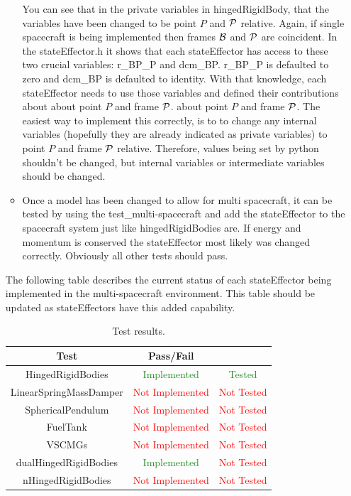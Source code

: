 \begin{itemize}
\begin{itemize}
		You can see that in the private variables in hingedRigidBody, that the variables have been changed to be point $P$ and $\cal P$ relative. Again, if single spacecraft is being implemented then frames $\cal B$ and $\cal P$ are coincident. In the stateEffector.h it shows that each stateEffector has access to these two crucial variables: r\_BP\_P and dcm\_BP. r\_BP\_P is defaulted to zero and dcm\_BP is defaulted to identity. With that knowledge, each stateEffector needs to use those variables and defined their contributions about about point $P$ and frame $\cal P$. about point $P$ and frame $\cal P$. The easiest way to implement this correctly, is to to change any internal variables (hopefully they are already indicated as private variables) to point $P$ and frame $\cal P$ relative. Therefore, values being set by python shouldn't be changed, but internal variables or intermediate variables should be changed. 
		\item Once a model has been changed to allow for multi spacecraft, it can be tested by using the test\_multi-spacecraft and add the stateEffector to the spacecraft system just like hingedRigidBodies are. If energy and momentum is conserved the stateEffector most likely was changed correctly. Obviously all other tests should pass.
	\end{itemize}

The following table describes the current status of each stateEffector being implemented in the multi-spacecraft environment. This table should be updated as stateEffectors have this added capability. 

\begin{table}[htbp]
	\caption{Test results.}
	\label{tab:results}
	\centering \fontsize{10}{10}\selectfont
	\begin{tabular}{c | c | c } %
		\hline
		\textbf{Test} 				    & \textbf{Pass/Fail} &  \\ \hline
		HingedRigidBodies  & \textcolor{ForestGreen}{Implemented} & \textcolor{ForestGreen}{Tested} \\
		LinearSpringMassDamper  & \textcolor{Red}{Not Implemented} & \textcolor{Red}{Not Tested} \\ 
		SphericalPendulum  & \textcolor{Red}{Not Implemented} & \textcolor{Red}{Not Tested} \\ 
		FuelTank  & \textcolor{Red}{Not Implemented} & \textcolor{Red}{Not Tested} \\ 
		VSCMGs  & \textcolor{Red}{Not Implemented} & \textcolor{Red}{Not Tested} \\ 
		dualHingedRigidBodies  & \textcolor{ForestGreen}{Implemented} & \textcolor{Red}{Not Tested} \\ 
		nHingedRigidBodies  & \textcolor{Red}{Not Implemented} & \textcolor{Red}{Not Tested} \\ 
		\hline
	\end{tabular}
\end{table}
\clearpage


\end{itemize}
